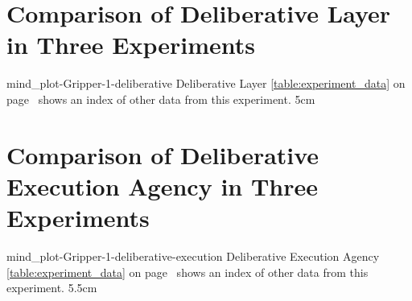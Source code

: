 {\clearpage
  \section{Comparison of Deliberative Layer in Three Experiments}
  \experimentcausegroupplots{\dataappendixmaxtime}
                            {\dataappendixexperimentonemaxtime}
                            {\dataappendixexperimenttwomaxtime}
                            {\dataappendixexperimentthreemaxtime}
                            {\dataappendixexperimentonename}
                            {\dataappendixexperimenttwoname}
                            {\dataappendixexperimentthreename}
                            {\dataappendixexperimentoneprettyname}
                            {\dataappendixexperimenttwoprettyname}
                            \experimentcausegroupplotscontinued{\dataappendixexperimentthreeprettyname}
                                                               {mind_plot-Gripper-1-deliberative}
                                                               {Deliberative Layer}
                                                               {  {\mbox{\autoref{table:experiment_data}}} on
                                                                 {\mbox{page~\pageref{table:experiment_data}}} shows an index of other data
                                                                 from this experiment.}
                                                               {5cm}
}                                                                 
{\clearpage
  \section{Comparison of Deliberative Execution Agency in Three Experiments}
  \experimentcausegroupplots{\dataappendixmaxtime}
                            {\dataappendixexperimentonemaxtime}
                            {\dataappendixexperimenttwomaxtime}
                            {\dataappendixexperimentthreemaxtime}
                            {\dataappendixexperimentonename}
                            {\dataappendixexperimenttwoname}
                            {\dataappendixexperimentthreename}
                            {\dataappendixexperimentoneprettyname}
                            {\dataappendixexperimenttwoprettyname}
                            \experimentcausegroupplotscontinued{\dataappendixexperimentthreeprettyname}
                                                               {mind_plot-Gripper-1-deliberative-execution}
                                                               {Deliberative Execution Agency}
                                                               {  {\mbox{\autoref{table:experiment_data}}} on
                                                                 {\mbox{page~\pageref{table:experiment_data}}} shows an index of other data
                                                                 from this experiment.}
                                                               {5.5cm}
}
